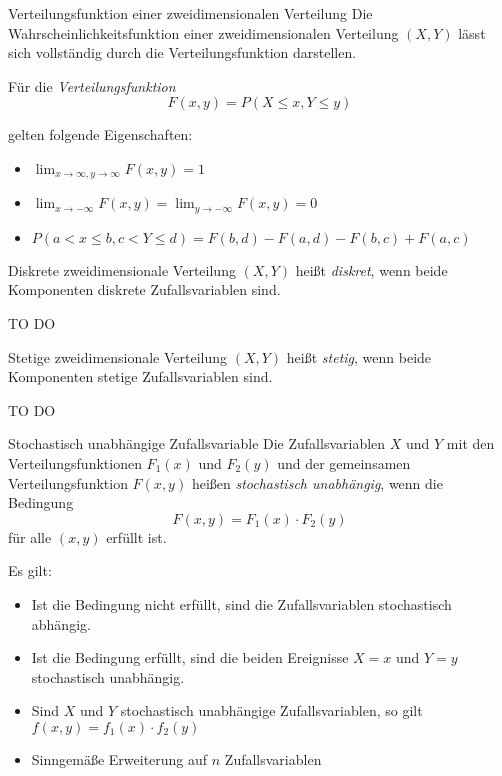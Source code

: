 \begin{defi}{Verteilungsfunktion einer zweidimensionalen Verteilung}
    Die Wahrscheinlichkeitsfunktion einer zweidimensionalen Verteilung $(X,Y)$ lässt sich vollständig durch die Verteilungsfunktion darstellen. 

    Für die \emph{Verteilungsfunktion} 
    \[
        F(x,y) = P(X \leq x, Y \leq y) 
    \]
    
    gelten folgende Eigenschaften:
    \begin{itemize}
        \item $\lim_{x\to \infty, y\to \infty} F(x,y) = 1$ 
        \item $\lim_{x \to -\infty} F(x,y) = \lim_{y \to -\infty} F(x,y) = 0$
        \item $P(a < x \leq b, c < Y \leq d) = F(b,d) - F(a,d) - F(b,c) + F(a,c)$
    \end{itemize}
\end{defi}

\begin{defi}{Diskrete zweidimensionale Verteilung}
    $(X,Y)$ heißt \emph{diskret}, wenn beide Komponenten diskrete Zufallsvariablen sind. 

    TO DO
\end{defi}

\begin{defi}{Stetige zweidimensionale Verteilung}
    $(X,Y)$ heißt \emph{stetig}, wenn beide Komponenten stetige Zufallsvariablen sind. 

    TO DO
\end{defi}

\begin{defi}{Stochastisch unabhängige Zufallsvariable}
    Die Zufallsvariablen $X$ und $Y$ mit den Verteilungsfunktionen $F_1(x)$ und $F_2(y)$ und der gemeinsamen Verteilungsfunktion $F(x,y)$ heißen \emph{stochastisch unabhängig}, wenn die Bedingung
    \[
        F(x,y) = F_1(x) \cdot F_2(y)
    \]
    für alle $(x,y)$ erfüllt ist.

    Es gilt: 
    \begin{itemize}
        \item Ist die Bedingung nicht erfüllt, sind die Zufallsvariablen stochastisch abhängig. 
        \item Ist die Bedingung erfüllt, sind die beiden Ereignisse $X = x$ und $Y = y$ stochastisch unabhängig. 
        \item Sind $X$ und $Y$ stochastisch unabhängige Zufallsvariablen, so gilt $f(x,y) = f_1(x) \cdot f_2(y)$ 
        \item Sinngemäße Erweiterung auf $n$ Zufallsvariablen 
    \end{itemize}
\end{defi}

